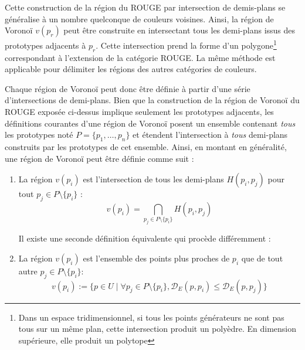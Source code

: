 \documentclass{article}
\begin{document}
\begin{figure}[h!]
\begin{minipage}{0.48\textwidth}
\end{minipage}

\end{figure}


\vspace*{1.8cm}
 Cette construction de la région du ROUGE par intersection de demis-plans se généralise à un nombre quelconque de couleurs voisines. Ainsi, la région de Voronoï $v(p_r)$ peut être construite en intersectant tous les demi-plans issus des prototypes adjacents à $p_r$. Cette intersection prend la forme d’un polygone\footnote{Dans un espace tridimensionnel, si tous les points générateurs ne sont pas tous sur un même plan, cette intersection produit un polyèdre. En dimension supérieure, elle produit un polytope} correspondant à l'extension de la catégorie ROUGE. La même méthode est applicable pour délimiter les régions des autres catégories de couleurs.

Chaque région de Voronoï peut donc être définie à partir d'une série d'intersections de demi-plans. Bien que la construction de la région de Voronoï du ROUGE exposée ci-dessus implique seulement les prototypes adjacents, les définitions courantes d'une région de Voronoï posent un ensemble contenant \textit{tous} les prototypes noté $P = \{p_1, \dots, p_n\}$ et étendent l'intersection à \textit{tous} demi-plans construits par les prototypes de cet ensemble. Ainsi, en montant en généralité, une région de Voronoï peut être définie comme suit :

\begin{enumerate}[label=\textbf{(\arabic*)}]
    \item La région $v(p_i)$ est l'intersection de tous les demi-plans $H(p_i, p_j)$ pour tout  $p_j \in P \setminus \{p_i\}$ :
    \[
        v(p_i) = \bigcap_{p_j \in P \setminus \{p_i\}} H(p_i, p_j)
    \]

    Il existe une seconde définition équivalente qui procède différemment :

    \item La région $v(p_i)$ est l'ensemble des points plus proches de $p_i$ que de tout autre $p_j \in P\setminus\{p_i\}:$
    \[
        v(p_i) := \{p \in U \mid \forall p_j \in P\setminus\{p_i\}, \mathcal{D}_E(p, p_i) \leq \mathcal{D}_E(p, p_j) \}
    \]
\end{enumerate}
\end{document}
